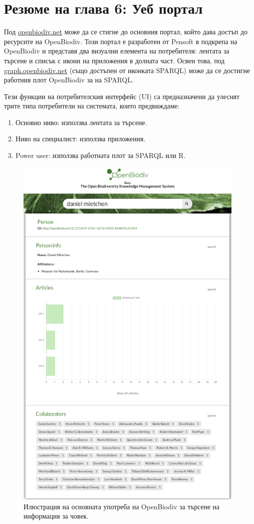 \chapter{Резюме на глава 6: Уеб портал}
\label{webportal}

Под \href{http://openbiodiv.net}{openbiodiv.net} може да се стигне до основния портал, който дава достъп до ресурсите на OpenBiodiv. Този портал е разработен от Pensoft в подкрепа на OpenBiodiv и представя два визуални елемента на потребителя: лентата за търсене и списък с икони на приложения в долната част. Освен това, под \href {http://graph.openbiodiv.net}{{graph.openbiodiv.net}} (също достъпен от иконката SPARQL) може да се достигне работния плот OpenBiodiv за  на SPARQL.

Тези функции на потребителския интерфейс (UI) са предназначени да улеснят трите типа потребители на системата, които предвиждаме:

\begin{enumerate}
\item Основно ниво: използва лентата за търсене.
\item Ниво на специалист: използва приложения.
\item Power user: използва работната плот за SPARQL или R.
\end{enumerate}

\begin{figure}
\centering
\includegraphics[width=\textwidth]{Figures/basic-level.png}
\decoRule
\caption{Илюстрация на основната употреба на OpenBiodiv за търсене на информация за човек.}
\label{fig:basic-level}
\end{figure}